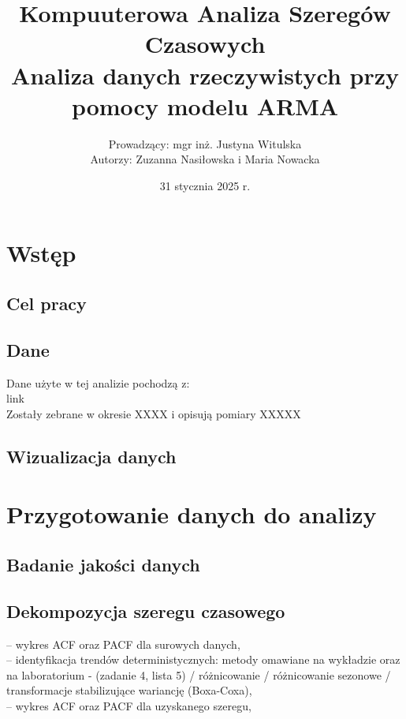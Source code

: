 \documentclass[12pt]{article}
\title{Kompuuterowa Analiza Szeregów Czasowych \\ \textbf{Analiza danych rzeczywistych przy pomocy modelu ARMA} }
\author{Prowadzący: mgr inż. Justyna Witulska \\  Autorzy: Zuzanna Nasiłowska i Maria Nowacka}
\date{31 stycznia 2025 r.}
\begin{document}
\maketitle

\section{Wstęp}
\subsection{Cel pracy}
\subsection{Dane}
Dane użyte w tej analizie pochodzą z:
\\link\\ Zostały zebrane w okresie XXXX i opisują pomiary XXXXX \\
\subsection{Wizualizacja danych}

\section{Przygotowanie danych do analizy}
\subsection{Badanie jakości danych}
\subsection{Dekompozycja szeregu czasowego}
– wykres ACF oraz PACF dla surowych danych, \\
– identyfikacja trendów deterministycznych: metody omawiane na wykładzie oraz na laboratorium -
(zadanie 4, lista 5) / różnicowanie / różnicowanie sezonowe / transformacje stabilizujące wariancję
(Boxa-Coxa), \\
– wykres ACF oraz PACF dla uzyskanego szeregu, \\
\end{document}
